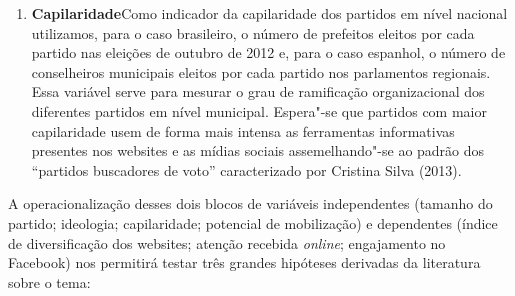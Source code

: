 \begin{enumerate}
\item\textbf{Capilaridade}\quad Como indicador da capilaridade dos partidos
em nível nacional utilizamos, para o caso brasileiro, o número de
prefeitos eleitos por cada partido nas eleições de outubro de 2012 e,
para o caso espanhol, o número de conselheiros municipais eleitos por
cada partido nos parlamentos regionais. Essa variável serve para mesurar
o grau de ramificação organizacional dos diferentes partidos em nível
municipal. Espera"-se que partidos com maior capilaridade usem de forma
mais intensa as ferramentas informativas presentes nos websites e as
mídias sociais assemelhando"-se ao padrão dos ``partidos buscadores de
voto'' caracterizado por Cristina Silva (2013).
\end{enumerate}

A operacionalização desses dois blocos de variáveis independentes
(tamanho do partido; ideologia; capilaridade; potencial de mobilização)
e dependentes (índice de diversificação dos websites; atenção recebida
\emph{online}; engajamento no Facebook) nos permitirá testar três grandes
hipóteses derivadas da literatura sobre o tema:

